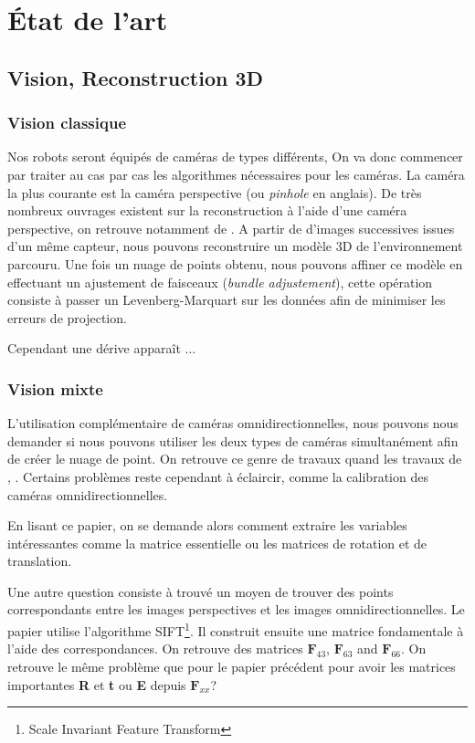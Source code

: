 \section{État de l'art}

\subsection{Vision, Reconstruction 3D}

\subsubsection{Vision classique}

Nos robots seront équipés de caméras de types différents, On va donc commencer par traiter au cas par cas les algorithmes nécessaires pour les caméras.
La caméra la plus courante est la caméra perspective (ou \textit{pinhole} en anglais).
De très nombreux ouvrages existent sur la reconstruction à l'aide d'une caméra perspective, on retrouve notamment   de \citeauthor{Hartley03Book} \cite{Hartley03Book}.
A partir de d'images successives issues d'un même capteur, nous pouvons reconstruire un modèle 3D de l'environnement parcouru.
Une fois un nuage de points obtenu, nous pouvons affiner ce modèle en effectuant un ajustement de faisceaux (\textit{bundle adjustement}), cette opération consiste à passer un Levenberg-Marquart sur les données afin de minimiser les erreurs de projection.

Cependant une dérive apparaît ...


\subsubsection{Vision mixte}

L'utilisation complémentaire de caméras omnidirectionnelles, nous pouvons nous demander si nous pouvons utiliser les deux types de caméras simultanément afin de créer le nuage de point.
On retrouve ce genre de travaux quand les travaux de
\citeauthor{Sturm02},  \cite{Sturm02}.
Certains problèmes reste cependant à éclaircir, comme la calibration des caméras omnidirectionnelles.

En lisant ce papier, on se demande alors comment extraire les variables intéressantes comme la matrice essentielle ou les matrices de rotation et de translation.

Une autre question consiste à trouvé un moyen de trouver des points correspondants entre les images perspectives et les images omnidirectionnelles.
Le papier \cite{Puig08} utilise l'algorithme SIFT\footnote{Scale Invariant Feature Transform}.
Il construit ensuite une matrice fondamentale à l'aide des correspondances.
On retrouve des matrices $\mathbf{F}_{43}$, $\mathbf{F}_{63}$ and $\mathbf{F}_{66}$.
On retrouve le même problème que pour le papier précédent pour avoir les matrices importantes \textbf{R} et \textbf{t} ou \textbf{E} depuis $\mathbf{F}_{xx}$?

